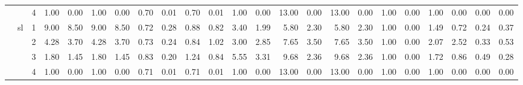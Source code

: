 \begin{tabular}{lllrrrrrrrrrrrrrrrrrrrr}
      &    & 4 & 1.00 & 0.00 & 1.00 & 0.00 & 0.70 & 0.01 & 0.70 & 0.01 & 1.00 & 0.00 & 13.00 & 0.00 & 13.00 & 0.00 & 1.00 & 0.00 &    1.00 & 0.00 &    0.00 & 0.00 \\
      & sl & 1 & 9.00 & 8.50 & 9.00 & 8.50 & 0.72 & 0.28 & 0.88 & 0.82 & 3.40 & 1.99 &  5.80 & 2.30 &  5.80 & 2.30 & 1.00 & 0.00 &    1.49 & 0.72 &    0.24 & 0.37 \\
      &    & 2 & 4.28 & 3.70 & 4.28 & 3.70 & 0.73 & 0.24 & 0.84 & 1.02 & 3.00 & 2.85 &  7.65 & 3.50 &  7.65 & 3.50 & 1.00 & 0.00 &    2.07 & 2.52 &    0.33 & 0.53 \\
      &    & 3 & 1.80 & 1.45 & 1.80 & 1.45 & 0.83 & 0.20 & 1.24 & 0.84 & 5.55 & 3.31 &  9.68 & 2.36 &  9.68 & 2.36 & 1.00 & 0.00 &    1.72 & 0.86 &    0.49 & 0.28 \\
      &    & 4 & 1.00 & 0.00 & 1.00 & 0.00 & 0.71 & 0.01 & 0.71 & 0.01 & 1.00 & 0.00 & 13.00 & 0.00 & 13.00 & 0.00 & 1.00 & 0.00 &    1.00 & 0.00 &    0.00 & 0.00 \\
\bottomrule
\end{tabular}
